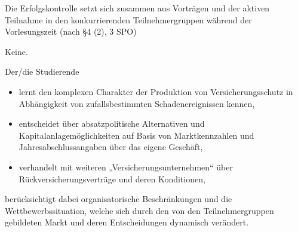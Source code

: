 \begin{course}

\setdoclanguagegerman
{}


\courselevel{}

\coursehead


\label{cour_14347.dp_997}


\begin{styleenv}
\begin{assessment}
Die Erfolgskontrolle setzt sich zusammen aus Vorträgen und der aktiven Teilnahme in den konkurrierenden Teilnehmergruppen während der Vorlesungszeit (nach §4 (2), 3 SPO)


\end{assessment}

\begin{conditions}Keine.\end{conditions}


\end{styleenv}

\begin{learningoutcomes}
Der/die Studierende

 \begin{itemize}\item lernt den komplexen Charakter der Produktion von Versicherungsschutz in Abhängigkeit von zufallsbestimmten Schadenereignissen kennen,  \item entscheidet über absatzpolitische Alternativen und Kapitalanlagemöglichkeiten auf Basis von Marktkennzahlen und Jahresabschlussangaben über das eigene Geschäft,  \item verhandelt mit weiteren „Versicherungsunternehmen“ über Rückversicherungsverträge und deren Konditionen,  \end{itemize}

berücksichtigt dabei organisatorische Beschränkungen und die Wettbewerbssituation, welche sich durch den von den Teilnehmergruppen gebildeten Markt und deren Entscheidungen dynamisch verändert.



\end{learningoutcomes}
\end{course}
